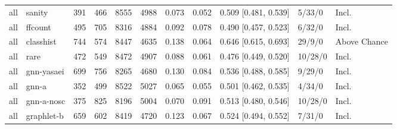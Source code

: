 \begin{tabular}{@{}llrrrrrrrll@{}}
all & sanity & 391 & 466 & 8555 & 4988 & 0.073 & 0.052 & 0.509 [0.481, 0.539] & 5/33/0 & Incl. \\
all & ffcount & 495 & 705 & 8316 & 4884 & 0.092 & 0.078 & 0.490 [0.457, 0.523] & 6/32/0 & Incl. \\
all & classhist & 744 & 574 & 8447 & 4635 & 0.138 & 0.064 & 0.646 [0.615, 0.693] & 29/9/0 & Above Chance \\
all & rare & 472 & 549 & 8472 & 4907 & 0.088 & 0.061 & 0.476 [0.449, 0.520] & 10/28/0 & Incl. \\
all & gnn-yasaei & 699 & 756 & 8265 & 4680 & 0.130 & 0.084 & 0.536 [0.488, 0.585] & 9/29/0 & Incl. \\
all & gnn-a & 352 & 499 & 8522 & 5027 & 0.065 & 0.055 & 0.501 [0.462, 0.535] & 4/34/0 & Incl. \\
all & gnn-a-nosc & 375 & 825 & 8196 & 5004 & 0.070 & 0.091 & 0.513 [0.480, 0.546] & 10/28/0 & Incl. \\
all & graphlet-b & 659 & 602 & 8419 & 4720 & 0.123 & 0.067 & 0.524 [0.494, 0.552] & 7/31/0 & Incl. \\
\bottomrule
\end{tabular}
